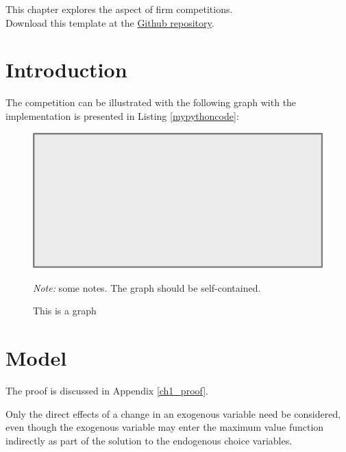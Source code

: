 This chapter explores the aspect of firm competitions. \lipsum[11]\\

Download this template at the \href{https://github.com/howardhsumail/Dissertation-Template.git}{Github repository}.

\section{Introduction}

The {\color{mycolor}competition} can be illustrated with the following graph with the implementation is presented in Listing \ref{mypythoncode}:

\begin{figure}[H]
  \centering
  \caption{This is a graph}
  \includegraphics[scale=0.5]{Graph/pic.pdf}
  \hspace*{-0.6cm}
  \begin{minipage}{0.9\textwidth}
    \onehalfspacing
    \vspace*{0.12cm}
    \begin{tablenotes}
      \footnotesize
      \item\textit{Note:} some notes. The graph should be self-contained. \lipsum[66]
    \end{tablenotes}
  \end{minipage}
\end{figure}

\section{Model}
\lipsum[4] The proof is discussed in Appendix \ref{ch1_proof}.

\begin{theorem}
  Only the direct effects of a change in an exogenous variable need be considered, even though the exogenous variable may enter the maximum value function indirectly as part of the solution to the endogenous choice variables.
\end{theorem}

